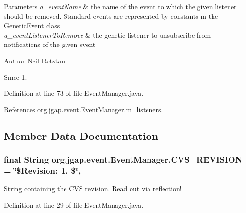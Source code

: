 \begin{DoxyParams}{Parameters}
{\em a\-\_\-event\-Name} & the name of the event to which the given listener should be removed. Standard events are represented by constants in the \hyperlink{classorg_1_1jgap_1_1event_1_1_genetic_event}{Genetic\-Event} class \\
\hline
{\em a\-\_\-event\-Listener\-To\-Remove} & the genetic listener to unsubscribe from notifications of the given event\\
\hline
\end{DoxyParams}
\begin{DoxyAuthor}{Author}
Neil Rotstan 
\end{DoxyAuthor}
\begin{DoxySince}{Since}
1. 
\end{DoxySince}


Definition at line 73 of file Event\-Manager.\-java.



References org.\-jgap.\-event.\-Event\-Manager.\-m\-\_\-listeners.



\subsection{Member Data Documentation}
\hypertarget{classorg_1_1jgap_1_1event_1_1_event_manager_a91fab79011659f81ef5badb04845dda8}{
\subsubsection[{C\-V\-S\-\_\-\-R\-E\-V\-I\-S\-I\-O\-N}]{\setlength{\rightskip}{0pt plus 5cm}final String org.\-jgap.\-event.\-Event\-Manager.\-C\-V\-S\-\_\-\-R\-E\-V\-I\-S\-I\-O\-N = \char`\"{}\$Revision\-: 1. \$\char`\"{}\hspace{0.3cm}{\ttfamily [static]}, {\ttfamily [private]}}}\label{classorg_1_1jgap_1_1event_1_1_event_manager_a91fab79011659f81ef5badb04845dda8}
String containing the C\-V\-S revision. Read out via reflection! 

Definition at line 29 of file Event\-Manager.\-java.

